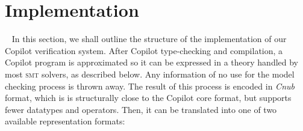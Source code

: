 \section{Implementation}~\label{sec:structure} 
%
%
In this section, we shall outline the structure of the implementation
of our Copilot verification system.   %
After Copilot type-checking and compilation, a Copilot program is approximated
so it can be expressed in a theory handled by most \textsc{smt} solvers, as described below. Any information
of no use for the model checking process is thrown away. The result of this
process is encoded in \textit{Cnub} format, which is is structurally close to the
Copilot core format, but supports fewer datatypes and operators. Then, it can be
translated into one of two available representation formats:

